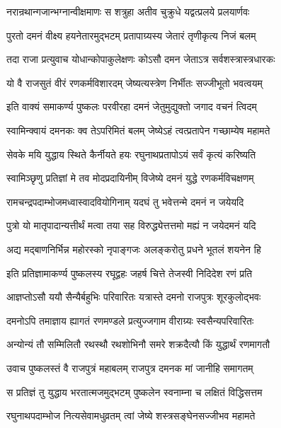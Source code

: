 \twolineshloka
{नरान्रथान्गजान्भग्नान्वीक्षमाणः स शत्रुहा}
{अतीव चुक्रुधे यद्वत्प्रलये प्रलयार्णवः}%

\twolineshloka
{पुरतो दमनं वीक्ष्य हयनेतारमुद्भटम्}
{प्रतापाग्र्यस्य जेतारं तृणीकृत्य निजं बलम्}%

\twolineshloka
{तदा राजा प्रत्युवाच योधान्कोपाकुलेक्षणः}
{कोऽसौ दमन जेताऽत्र सर्वशस्त्रास्त्रधारकः}%

\twolineshloka
{यो वै राजसुतं वीरं रणकर्मविशारदम्}
{जेष्यत्यस्त्रेण निर्भीतः सज्जीभूतो भवत्वयम्}%

\twolineshloka
{इति वाक्यं समाकर्ण्य पुष्कलः परवीरहा}
{दमनं जेतुमुद्युक्तो जगाद वचनं त्विदम्}%

\twolineshloka
{स्वामिन्क्वायं दमनकः क्व तेऽपरिमितं बलम्}
{जेष्येऽहं त्वत्प्रतापेन गच्छाम्येष महामते}%

\twolineshloka
{सेवके मयि युद्धाय स्थिते कैर्नीयते हयः}
{रघुनाथप्रतापोऽयं सर्वं कृत्यं करिष्यति}%

\twolineshloka
{स्वामिञ्छृणु प्रतिज्ञां मे तव मोदप्रदायिनीम्}
{विजेष्ये दमनं युद्धे रणकर्मविचक्षणम्}%

\twolineshloka
{रामचन्द्रपदाम्भोजमध्वास्वादवियोगिनाम्}
{यदघं तु भवेत्तन्मे दमनं न जयेयदि}%

\twolineshloka
{पुत्रो यो मातृपादान्यत्तीर्थं मत्वा तया सह}
{विरुद्ध्येत्तत्तमो मह्यं न जयेदमनं यदि}%

\twolineshloka
{अद्य मद्बाणनिर्भिन्न महोरस्को नृपाङ्गजः}
{अलङ्करोतु प्रधने भूतलं शयनेन हि}%


\twolineshloka
{इति प्रतिज्ञामाकर्ण्य पुष्कलस्य रघूद्वहः}
{जहर्ष चित्ते तेजस्वी निदिदेश रणं प्रति}%

\twolineshloka
{आज्ञप्तोऽसौ ययौ सैन्यैर्बहुभिः परिवारितः}
{यत्रास्ते दमनो राजपुत्रः शूरकुलोद्भवः}%

\twolineshloka
{दमनोऽपि तमाज्ञाय ह्यागतं रणमण्डले}
{प्रत्युज्जगाम वीराग्र्यः स्वसैन्यपरिवारितः}%

\twolineshloka
{अन्योन्यं तौ सम्मिलितौ रथस्थौ रथशोभिनौ}
{समरे शक्रदैत्यौ किं युद्धार्थं रणमागतौ}%

\twolineshloka
{उवाच पुष्कलस्तं वै राजपुत्रं महाबलम्}
{राजपुत्र दमनक मां जानीहि समागतम्}%

\twolineshloka
{स प्रतिज्ञं तु युद्धाय भरतात्मजमुद्भटम्}
{पुष्कलेन स्वनाम्ना च लक्षितं विद्धिसत्तम}%

\twolineshloka
{रघुनाथपदाम्भोज नित्यसेवामधुव्रतम्}
{त्वां जेष्ये शस्त्रसङ्घेनसज्जीभव महामते}%

